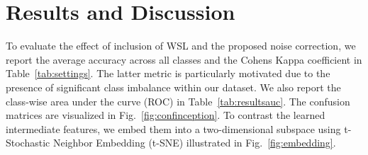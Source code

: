 \documentclass{llncs}
\begin{document}








\section{Results and Discussion}
To evaluate the effect of inclusion of WSL and the proposed noise correction, we report the average accuracy across all classes and the Cohens Kappa coefficient in Table~\ref{tab:settings}. The latter metric is particularly motivated due to the presence of significant class imbalance within our dataset. We also report the class-wise area under the curve (ROC) in Table~\ref{tab:resultsauc}. The confusion matrices are visualized in Fig.~\ref{fig:confinception}. To contrast the learned intermediate features, we embed them into a two-dimensional subspace using t-Stochastic Neighbor Embedding (t-SNE) illustrated in Fig.~\ref{fig:embedding}.  
\end{document}
